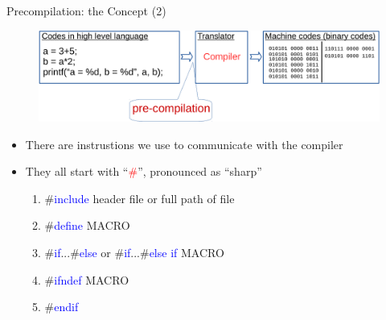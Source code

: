 \begin{frame}{Precompilation: the Concept (2)}
\begin{figure}
	\includegraphics[width=0.9\linewidth]{figs/compil1.pdf}
\end{figure}

\begin{itemize}
	\item {There are instrustions we use to communicate with the compiler}
	\item {They all start with ``\textcolor{red}{\#}'', pronounced as ``sharp''}
	\begin{enumerate}
		\item {\#\textcolor{blue}{include} header file or full path of file}
		\item {\#\textcolor{blue}{define} MACRO}
		\item {\#\textcolor{blue}{if}...\#\textcolor{blue}{else} or \#\textcolor{blue}{if}...\#\textcolor{blue}{else if} MACRO}
		\item {\#\textcolor{blue}{ifndef} MACRO}
		\item {\#\textcolor{blue}{endif}}
	\end{enumerate}
\end{itemize}

\end{frame}

